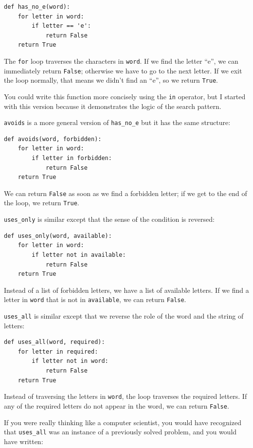 \documentclass[10pt]{book}
\begin{document}
\begin{verbatim}
def has_no_e(word):
    for letter in word:
        if letter == 'e':
            return False
    return True
\end{verbatim}
%
The {\tt for} loop traverses the characters in {\tt word}.  If we find
the letter ``e'', we can immediately return {\tt False}; otherwise we
have to go to the next letter.  If we exit the loop normally, that
means we didn't find an ``e'', so we return {\tt True}.

You could write this function more concisely using the {\tt in}
operator, but I started with this version because it 
demonstrates the logic of the search pattern.

{\tt avoids} is a more general version of \verb"has_no_e" but it
has the same structure:

\begin{verbatim}
def avoids(word, forbidden):
    for letter in word:
        if letter in forbidden:
            return False
    return True
\end{verbatim}
%
We can return {\tt False} as soon as we find a forbidden letter;
if we get to the end of the loop, we return {\tt True}.

\verb"uses_only" is similar except that the sense of the condition
is reversed:

\begin{verbatim}
def uses_only(word, available):
    for letter in word: 
        if letter not in available:
            return False
    return True
\end{verbatim}
%
Instead of a list of forbidden letters, we have a list of available
letters.  If we find a letter in {\tt word} that is not in
{\tt available}, we can return {\tt False}.

\verb"uses_all" is similar except that we reverse the role
of the word and the string of letters:

\begin{verbatim}
def uses_all(word, required):
    for letter in required: 
        if letter not in word:
            return False
    return True
\end{verbatim}
%
Instead of traversing the letters in {\tt word}, the loop
traverses the required letters.  If any of the required letters
do not appear in the word, we can return {\tt False}.

If you were really thinking like a computer scientist, you would
have recognized that \verb"uses_all" was an instance of a
previously solved problem, and you would have written:
\end{document}
